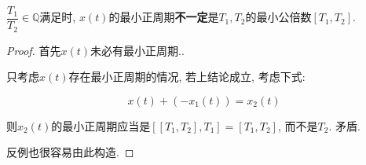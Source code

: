\vspace{2em}

$ \dfrac{T_1}{T_2} \in \mathbb{Q}$满足时, $ x(t)$的最小正周期\textbf{不一定}是$ T_1, T_2$的最小公倍数$ [T_1, T_2]$.
\begin{proof}
首先$ x(t)$未必有最小正周期..

只考虑$ x(t)$存在最小正周期的情况, 若上结论成立, 考虑下式:

\[ x(t) + (-x_1(t)) = x_2(t)\]

则$ x_2(t)$的最小正周期应当是$[[T_1, T_2], T_1] = [T_1, T_2]$, 而不是$T_2$. 矛盾.

反例也很容易由此构造.
\end{proof}
